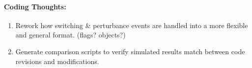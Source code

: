 \documentclass[12pt]{article}
\begin{document}
\begin{multicols}{2}
	
	\paragraph{Coding Thoughts:} 
		\begin{enumerate}
	
			\itemsep 0em 
			\item Rework how switching \& perturbance events are handled into a more flexible and general format. (flags? objects?)
			\item Generate comparison scripts to verify simulated results match  between code revisions and modifications.
	
		\end{enumerate}
		
\vfill\null

\end{multicols}
\end{document}
